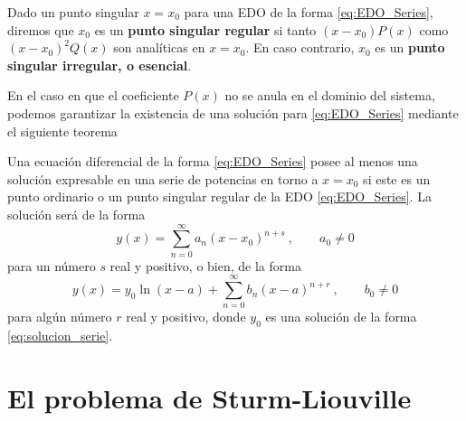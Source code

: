 \begin{defi}
    Dado un punto singular $x=x_0$ para una EDO de la forma \eqref{eq:EDO_Series}, diremos que $x_0$ es un \textbf{punto singular regular} si tanto $(x-x_0)P(x)$ como $(x-x_0)^2Q(x)$ son analíticas en $x=x_0$. En caso contrario, $x_0$ es un \textbf{punto singular irregular, o esencial}.
\end{defi}

En el caso en que el coeficiente $P(x)$ no se anula en el dominio del sistema, podemos garantizar la existencia de una solución para \eqref{eq:EDO_Series} mediante el siguiente teorema
\begin{teorema}[de Fuchs]
    Una ecuación diferencial de la forma \eqref{eq:EDO_Series} posee al menos una solución expresable en una serie de potencias en torno a $x=x_0$ si este es un punto ordinario o un punto singular regular de la EDO \eqref{eq:EDO_Series}. La solución será de la forma 
    \begin{equation} \label{eq:solucion_serie}
        y(x) = \sum_{n=0}^\infty a_n(x-x_0)^{n+s} \ , \qquad a_0 \neq 0
    \end{equation}
    para un número $s$ real y positivo, o bien, de la forma 
    \begin{equation}
        y(x) = y_0 \ln(x-a) + \sum_{n=0}^\infty b_n (x-a)^{n+r} \ , \qquad b_0 \neq 0 
    \end{equation}
    para algún número $r$ real y positivo, donde $y_0$ es una solución de la forma \eqref{eq:solucion_serie}.
\end{teorema}



\section{El problema de Sturm-Liouville}


